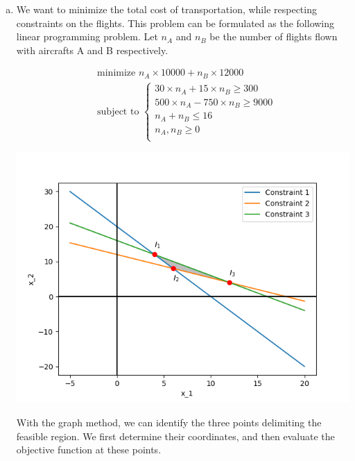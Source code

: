 \documentclass[a4paper, 10pt, twoside]{article}
\begin{document}
\begin{enumerate}[a)]
    \item We want to minimize the total cost of transportation, while respecting constraints on the flights. This problem can be formulated as the following linear programming problem.
          Let $n_{A}$ and $n_{B}$ be the number of flights flown with aircrafts A and B respectively.

          \begin{align*}
               & \text{minimize } n_{A} \times 10000 + n_{B} \times 12000 \\
               & \text{subject to }
              \begin{cases}
                  30 \times n_{A} + 15 \times n_{B} \ge 300    \\
                  500 \times n_{A} - 750 \times n_{B} \ge 9000 \\
                  n_{A} + n_{B} \le 16                         \\
                  n_{A}, n_{B} \ge 0                           \\
              \end{cases}
          \end{align*}

          \begin{center}
              \includegraphics[width = .5\textwidth]{graph2.png}
          \end{center}

          With the graph method, we can identify the three points delimiting the feasible region. We first determine their coordinates, and then evaluate the objective function at these points.


\end{enumerate}
\end{document}
